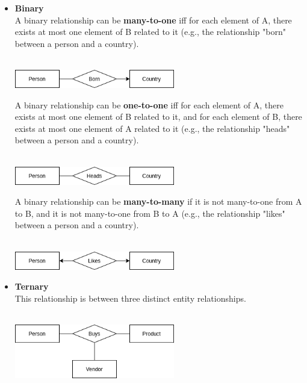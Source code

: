 \documentclass{article}
\begin{document}
\begin{itemize}
	\item \textbf{Binary}
	\vspace{.2cm} \\
	A binary relationship can be \textbf{many-to-one} iff for each element of A, there exists at most one element of B related to it (e.g., the relationship "born" between a person and a country). \\ \\
	
	\centerline{\includegraphics[width=7cm]{./assets/many-to-one.png}}
	\vspace{.6cm}
	A binary relationship can be \textbf{one-to-one} iff for each element of A, there exists at most one element of B related to it, and for each element of B, there exists at most one element of A related to it (e.g., the relationship "heads" between a person and a country). \\ \\
	
	\centerline{\includegraphics[width=7cm]{./assets/one-to-one.png}}
	\vspace{.6cm}
	A binary relationship can be \textbf{many-to-many} if it is not many-to-one from A to B, and it is not many-to-one from B to A (e.g., the relationship "likes" between a person and a country). \\ \\
	
	\centerline{\includegraphics[width=7cm]{./assets/many-to-many.png}}
	\vspace{.6cm}
	
	\item \textbf{Ternary}
	\vspace{.2cm} \\
	This relationship is between three distinct entity relationships. \\ \\
	
	\centerline{\includegraphics[width=7cm]{./assets/ternary.png}}
	\vspace{.6cm}
	

\end{itemize}
\end{document}

